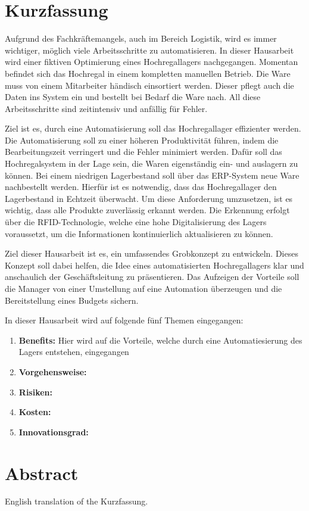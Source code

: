 \chapter*{Kurzfassung} %

Aufgrund des Fachkräftemangels, auch im Bereich Logistik, wird es immer wichtiger, möglich viele Arbeitsschritte zu automatisieren.
In dieser Hausarbeit wird einer fiktiven Optimierung eines Hochregallagers nachgegangen. 
Momentan befindet sich das Hochregal in einem kompletten manuellen Betrieb. Die Ware muss von einem Mitarbeiter händisch einsortiert werden. Dieser pflegt auch die Daten ins System ein und bestellt bei Bedarf die Ware nach.
All diese Arbeitsschritte sind zeitintensiv und anfällig für Fehler.

Ziel ist es, durch eine Automatisierung soll das Hochregallager effizienter werden. Die Automatisierung soll zu einer höheren Produktivität führen, indem die Bearbeitungszeit verringert und die Fehler minimiert werden. Dafür soll das Hochregalsystem in der Lage sein, die Waren eigenständig ein- und auslagern zu können. 
Bei einem niedrigen Lagerbestand soll über das ERP-System neue Ware nachbestellt werden. Hierfür ist es notwendig, dass das Hochregallager den Lagerbestand in Echtzeit überwacht. Um diese Anforderung umzusetzen, ist es wichtig, dass alle Produkte zuverlässig erkannt werden. Die Erkennung erfolgt über die RFID-Technologie, welche eine hohe Digitalisierung des Lagers voraussetzt, um die Informationen kontinuierlich aktualisieren zu können.

Ziel dieser Hausarbeit ist es, ein umfassendes Grobkonzept zu entwickeln. Dieses Konzept soll dabei helfen, die Idee eines automatisierten Hochregallagers klar und anschaulich der Geschäftsleitung zu präsentieren. 
Das Aufzeigen der Vorteile soll die Manager von einer Umstellung auf eine Automation überzeugen und die Bereitstellung eines Budgets sichern.

In dieser Hausarbeit wird auf folgende fünf Themen eingegangen:
\begin{enumerate}
	\item \textbf{Benefits: }Hier wird auf die Vorteile, welche durch eine Automatiesierung des Lagers entstehen, eingegangen
	\item \textbf{Vorgehensweise:}
	\item \textbf{Risiken:}
	\item \textbf{Kosten:}
	\item \textbf{Innovationsgrad:}
\end{enumerate}
\clearpage

\chapter*{Abstract} %

English translation of the \glqq Kurzfassung\grqq.

\clearpage